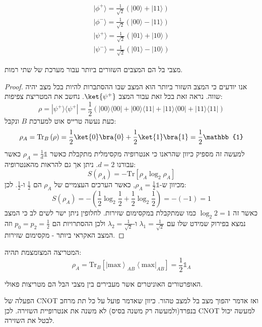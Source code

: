 \documentclass{tstextbook}
\begin{document}
\begin{definition}[מצבי בל]
$$\begin{array}{c}{{|\phi^{+}\rangle=\frac{1}{\sqrt{2}}(|00\rangle+|11\rangle)}}\\ {{|\phi^{-}\rangle=\frac{1}{\sqrt{2}}(|00\rangle-|11\rangle)}}\\ {{|\psi^{+}\rangle=\frac{1}{\sqrt{2}}(|01\rangle+|10\rangle)}}\\ {{|\psi^{-}\rangle=\frac{1}{\sqrt{2}}(|01\rangle-|10\rangle)}}\end{array}$$

\end{definition}
\begin{proposition}
מצבי בל הם המצבים השזורים ביותר עבור מערכת של שתי רמות.

\end{proposition}
\begin{proof}
אנו יודעים כי המצב השזור ביותר הוא המצב שבו ההסתברות להיות בכל מצב יהיה שווה. נראה זאת בכל זאת עבור המצב \(\ket{\psi^{+}}\). נחשב את המטריצת צפיפות:
$$ ρ = |\psi^{+}⟩⟨\psi^{+}| = \frac{1}{2}(|00⟩⟨00| + |00⟩⟨11| + |11⟩⟨00| + |11⟩⟨11|) $$
כעת נעשה טרייס אוט למערכת \(B\) ונקבל:
$$\rho_{A}=\mathrm{Tr}_{B}\left( \rho \right)= \frac{1}{2}\ket{0} \bra{0}  +\frac{1}{2}\ket{1}\bra{1}   = \frac{1}{2}\mathbb{1} $$
למעשה זה מספיק כיוון שהראנו כי אנטרופיה מקסימלית מתקבלת כאשר \(\rho_{A}=\frac{1}{d}\mathbb{1}\) כאשר עבורנו \(d=2\). ניתן אך גם להראות מהאנטרופיה:
$$ S(ρ_A) = -\text{Tr}[ρ_A \log_2 ρ_A] $$
מכיוון ש-\(ρ_A = \frac{1}{2}\mathbb{1}\), כאשר הערכים העצמיים של \(\rho_{A}\) הם \(\frac{1}{2}\) ו-\(\frac{1}{2}\). לכן:
$$ S(ρ_A) = -\left( \frac{1}{2}\log_2\frac{1}{2} + \frac{1}{2}\log_2\frac{1}{2} \right) = -(-1) = 1 $$
כאשר זה \(\log_{2}2=1\) כמו שמתקבלת במקסימום שזירות. לחלופין ניתן ישר לשים לב כי המצב נמצא בפירוק שמידט שלו עם \(\lambda_{1}=\frac{1}{\sqrt{ 2 }}\) ו-\(\lambda_{2}=\frac{1}{\sqrt{ 2 }}\) ולכן ההסתרויות הם \(p_{0}=p_{2}=\frac{1}{2}\) וזה המצב האקראי ביותר - מקסימום שזירות.

\end{proof}
\begin{corollary}
המטריצה המצומצמת תהיה:
$$\rho_{A}=\mathrm{Tr}_{B}\left[\left|\mathrm{max}\right\rangle_{A B}\left\langle\mathrm{max}\right|_{A B}\right]=\frac{1}{2}\mathbb{1}_{A}$$

\end{corollary}
\begin{proposition}
האופרטורים האוניטרים אשר מעבירים בין מצבי הבל הם מטריצות פאולי.

\end{proposition}
\begin{proposition}
הפעלה של CNOT ואז אדמר יהפוך מצב בל למצב טהור. כיוון שאדמר פועל על כל תת מרחב בנפרד(ולמעשה רק משנה בסיס) לא משנה את אנטרופיית השזירה. לכן CNOT למעשה יכול לבטל את השזירה.

\end{proposition}
\end{document}
